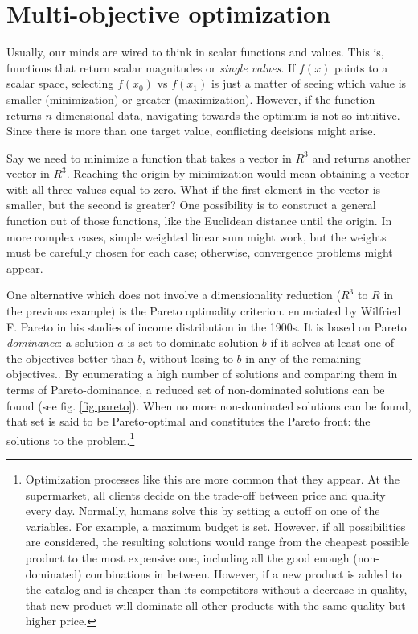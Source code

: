 \section{Multi-objective optimization}
\label{section:multiobjective}

Usually, our minds are wired to think in scalar functions and values. This is, functions that return scalar magnitudes or \textit{single values}. If $f(x)$ points to a scalar space, selecting $f(x_{0})$ vs $f(x_{1})$ is just a matter of seeing which value is smaller (minimization) or greater (maximization). However, if the function returns $n$-dimensional data, navigating towards the optimum is not so intuitive. Since there is more than one target value, conflicting decisions might arise.

Say we need to minimize a function that takes a vector in $R^{3}$ and returns another vector in $R^{3}$. Reaching the origin by minimization would mean obtaining a vector with all three values equal to zero. What if the first element in the vector is smaller, but the second is greater? One possibility is to construct a general function out of those functions, like the Euclidean distance until the origin. In more complex cases, simple weighted linear sum might work, but the weights must be carefully chosen for each case; otherwise, convergence problems might appear.\cite{das1997closer}

One alternative which does not involve a dimensionality reduction ($R^{3}$ to $R$ in the previous example) is the Pareto optimality criterion. enunciated by Wilfried F. Pareto in his studies of income distribution in the 1900s. It is based on Pareto \textit{dominance}: a solution $a$ is set to dominate solution $b$ if it solves at least one of the objectives better than $b$, without losing to $b$ in any of the remaining objectives.\cite{deb1999multi}. By enumerating a high number of solutions and comparing them in terms of Pareto-dominance, a reduced set of non-dominated solutions can be found (see fig. \ref{fig:pareto}). When no more non-dominated solutions can be found, that set is said to be Pareto-optimal and constitutes the Pareto front: the solutions to the problem.\footnote{Optimization processes like this are more common that they appear. At the supermarket, all clients decide on the trade-off between price and quality every day. Normally, humans solve this by setting a cutoff on one of the variables. For example, a maximum budget is set. However, if all possibilities are considered, the resulting solutions would range from the cheapest possible product to the most expensive one, including all the good enough (non-dominated) combinations in between. However, if a new product is added to the catalog and is cheaper than its competitors without a decrease in quality, that new product will dominate all other products with the same quality but higher price.}

